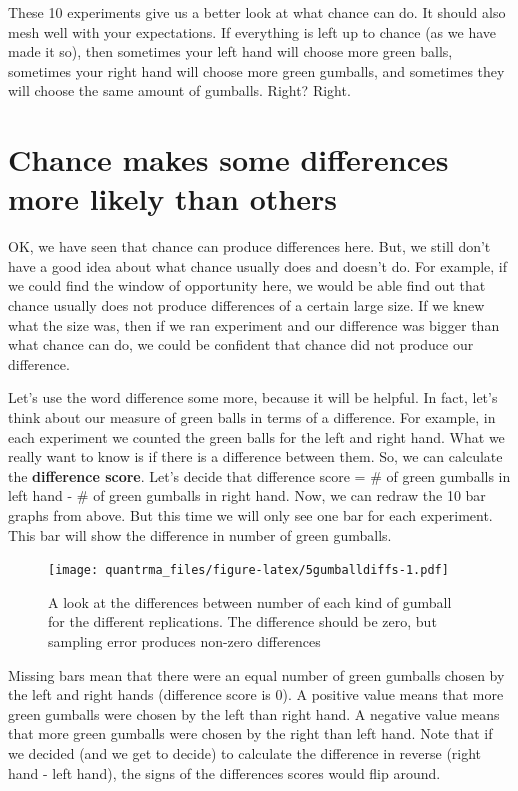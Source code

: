 \documentclass[
]{book}
\begin{document}
These 10 experiments give us a better look at what chance can do. It should also mesh well with your expectations. If everything is left up to chance (as we have made it so), then sometimes your left hand will choose more green balls, sometimes your right hand will choose more green gumballs, and sometimes they will choose the same amount of gumballs. Right? Right.

\hypertarget{chance-makes-some-differences-more-likely-than-others}{%
\section{Chance makes some differences more likely than others}\label{chance-makes-some-differences-more-likely-than-others}}

OK, we have seen that chance can produce differences here. But, we still don't have a good idea about what chance usually does and doesn't do. For example, if we could find the window of opportunity here, we would be able find out that chance usually does not produce differences of a certain large size. If we knew what the size was, then if we ran experiment and our difference was bigger than what chance can do, we could be confident that chance did not produce our difference.

Let's use the word difference some more, because it will be helpful. In fact, let's think about our measure of green balls in terms of a difference. For example, in each experiment we counted the green balls for the left and right hand. What we really want to know is if there is a difference between them. So, we can calculate the \textbf{difference score}. Let's decide that difference score = \# of green gumballs in left hand - \# of green gumballs in right hand. Now, we can redraw the 10 bar graphs from above. But this time we will only see one bar for each experiment. This bar will show the difference in number of green gumballs.

\begin{figure}
\centering
\texttt{[image: quantrma\_files/figure-latex/5gumballdiffs-1.pdf]}
\caption{\label{fig:5gumballdiffs}A look at the differences between number of each kind of gumball for the different replications. The difference should be zero, but sampling error produces non-zero differences}
\end{figure}

Missing bars mean that there were an equal number of green gumballs chosen by the left and right hands (difference score is 0). A positive value means that more green gumballs were chosen by the left than right hand. A negative value means that more green gumballs were chosen by the right than left hand. Note that if we decided (and we get to decide) to calculate the difference in reverse (right hand - left hand), the signs of the differences scores would flip around.
\end{document}
